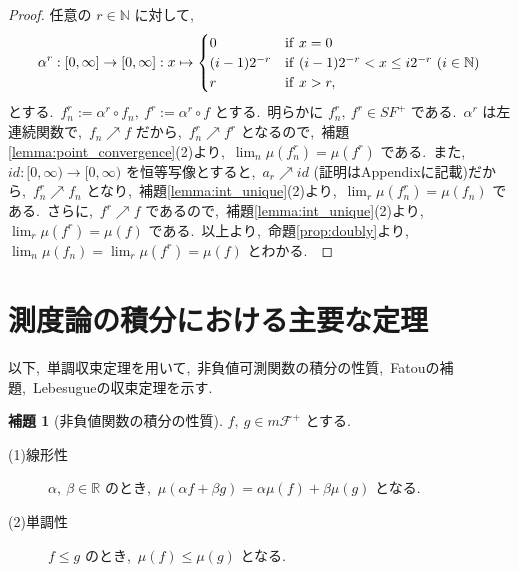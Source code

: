 \documentclass[a4j,11pt]{jarticle}
\theoremstyle{definition}
\newtheorem{lemma}[theorem]{補題}
\begin{document}
\begin{proof}
  任意の
  $r \in \mathbb{N}$
  に対して,\ 
  \begin{equation}
    \alpha^r:\left[ 0,\infty\right] \to \left[ 0,\infty\right]:x\mapsto
    \begin{cases}
      0 & {\rm if}\ x=0 \\
      (i-1)2^{-r} & {\rm if}\ (i-1)2^{-r} < x \leq i2^{-r} \ (i\in\mathbb{N}) \\
      r & {\rm if} \ x > r,
    \end{cases}
  \end{equation}
  とする.\ 
  $f_n^r:=\alpha^r \circ f_n,\ f^r:=\alpha^r \circ f$
  とする.\ 
  明らかに
  $f_n^r,\ f^r \in SF^+$
  である.\ 
  $\alpha^r$
  は左連続関数で,\ 
  $f_n \nearrow f$
  だから,\ 
  $f_n^r \nearrow f^r$
  となるので,\ 補題\ref{lemma:point_convergence}(2)より,\ 
  $\lim_n \mu(f_n^r) = \mu(f^r)$
  である.\ 
  また,\ 
  $id:[0,\infty) \to [0,\infty)$
  を恒等写像とすると,\ 
  $a_r \nearrow id$
  (証明はAppendixに記載)だから,\ 
  $f_n^r \nearrow f_n$
  となり,\ 補題\ref{lemma:int_unique}(2)より,\ 
  $\lim_r \mu(f_n^r) = \mu(f_n)$
  である.\ 
  さらに,\ 
  $f^r \nearrow f$
  であるので,\ 補題\ref{lemma:int_unique}(2)より,\ 
  $\lim_r \mu(f^r) = \mu(f)$
  である.\ 
  以上より,\ 命題\ref{prop:doubly}より,\ 
  $\lim_n \mu(f_n) = \lim_r \mu(f^r) = \mu(f)$
  とわかる.\ 
\end{proof}

\section*{測度論の積分における主要な定理}
以下,\ 単調収束定理を用いて,\ 非負値可測関数の積分の性質,\ Fatouの補題,\ Lebesugueの収束定理を示す.\ 

\begin{lemma}[非負値関数の積分の性質]
  $f,\ g\in m\mathcal{F}^+$
  とする.\ 
  \begin{description}
    \item[(1)線形性]
      $\alpha,\ \beta \in \mathbb{R}$
      のとき,\ 
      $\mu(\alpha f + \beta g) = \alpha \mu(f) + \beta \mu(g)$
      となる.\ 
    \item[(2)単調性]
      $f \leq g$
      のとき,\ 
      $\mu(f) \leq \mu(g)$
      となる.\ 
  \end{description}
\end{lemma}
\end{document}
